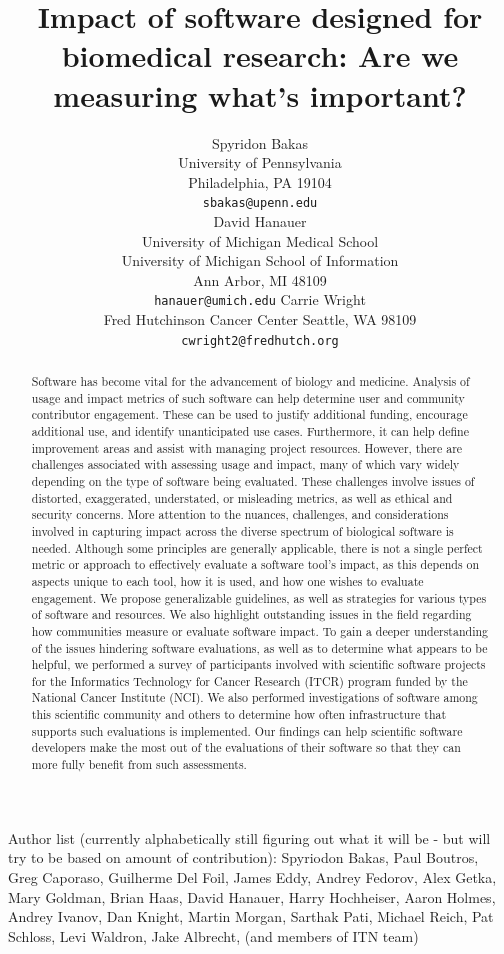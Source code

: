 \documentclass{article}
\title{Impact of software designed for biomedical research: Are we measuring what's important?}
\author{
Spyridon Bakas \\
    University of Pennsylvania \\
    Philadelphia, PA 19104 \\
    \texttt{sbakas@upenn.edu} \\
\AND
David Hanauer \\
    University of Michigan Medical School\\
    University of Michigan School of Information\\
    Ann Arbor, MI 48109\\
    \texttt{hanauer@umich.edu}
\AND
Carrie Wright \\
    Fred Hutchinson Cancer Center
    Seattle, WA 98109 \\
    \texttt{cwright2@fredhutch.org}\\
}
\begin{document}
\maketitle
Author list (currently alphabetically still figuring out what it will be - but will try to be based on amount of contribution):
Spyriodon Bakas, Paul Boutros, Greg Caporaso,  Guilherme Del Foil, James Eddy, Andrey Fedorov, Alex Getka, Mary Goldman, Brian Haas, David Hanauer, Harry Hochheiser, Aaron Holmes, Andrey Ivanov, Dan Knight, Martin Morgan, Sarthak Pati, Michael Reich, Pat Schloss, Levi Waldron, Jake Albrecht, (and members of ITN team)
\begin{abstract}
Software has become vital for the advancement of biology and medicine. Analysis of usage and impact metrics of such software can help determine user and community contributor engagement. These can be used to justify additional funding, encourage additional use, and identify unanticipated use cases. Furthermore, it can help define improvement areas and assist with managing project resources. However, there are challenges associated with assessing usage and impact, many of which vary widely depending on the type of software being evaluated. These challenges involve issues of distorted, exaggerated, understated, or misleading metrics, as well as ethical and security concerns.  More attention to the nuances, challenges, and considerations involved in capturing impact across the diverse spectrum of biological software is needed. Although some principles are generally applicable, there is not a single perfect metric or approach to effectively evaluate a software tool’s impact, as this depends on aspects unique to each tool, how it is used, and how one wishes to evaluate engagement. We propose generalizable guidelines, as well as strategies for various types of software and resources. We also highlight outstanding issues in the field regarding how communities measure or evaluate software impact. To gain a deeper understanding of the issues hindering software evaluations, as well as to determine what appears to be helpful, we performed a survey of participants involved with scientific software projects for the Informatics Technology for Cancer Research (ITCR) program funded by the National Cancer Institute (NCI). We also performed investigations of software among this scientific community and others to determine how often infrastructure that supports such evaluations is implemented.  Our findings can help scientific software developers make the most out of the evaluations of their software so that they can more fully benefit from such assessments.
\end{abstract}
\end{document}
